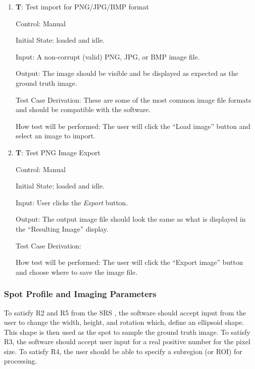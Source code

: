 \documentclass[12pt, titlepage]{article}
\newcounter{testnum} %
\begin{document}
\begin{enumerate}

  \item{\textbf{T\thetestnum \label{T_inputImage}}: Test import for PNG/JPG/BMP format\\}
            
  Control: Manual
            
  Initial State: \progname{} loaded and idle.
            
  Input: A non-corrupt (valid) PNG, JPG, or BMP image file.
            
  Output: The image should be visible and be displayed as expected as the ground truth image.
            
  Test Case Derivation: These are some of the most common image file formats and should be compatible with the software.
            
  How test will be performed: The user will click the ``Load image'' button and select an image to import.

  \item{\textbf{T\thetestnum \label{T_exportImage}}: Test PNG Image Export\\}
              
  Control: Manual
            
  Initial State: \progname{} loaded and idle.
            
  Input: User clicks the \textit{Export} button.
            
  Output: The output image file should look the same as what is displayed in the ``Resulting Image'' display.

  Test Case Derivation: 

  How test will be performed: The user will click the ``Export image'' button and choose where to save the image file.

\end{enumerate}


\subsubsection{Spot Profile and Imaging Parameters} \label{subsec_spot}

To satisfy R2 and R5 from the SRS \citep{SRS}, the software should accept input from the user
to change the width, height, and rotation which, define an ellipsoid shape. 
This shape is then used as the spot to sample the ground truth image.
To satisfy R3, the software should accept user input for a real positive number for the pixel size.
To satisfy R4, the user should be able to specify a subregion (or ROI) for processing.
\end{document}

